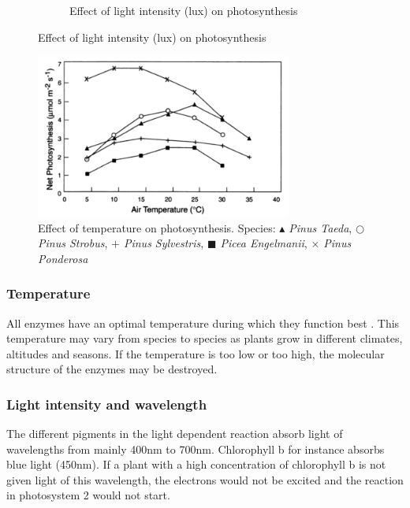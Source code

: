 \begin{figure}
\begin{subfigure}[b]{0.45\textwidth}
                \caption{Effect of light intensity (lux) on photosynthesis}
                \label{fig:lightintensity}
        \end{subfigure}
       
\end{figure}

\begin{figure}
\centering
\includegraphics[width=0.75\textwidth]{img/photosynthesis/temperature_new.png}
\caption{Effect of temperature on photosynthesis. Species:
 \textit{\ensuremath{\blacktriangle} Pinus Taeda},  
\textit{\ensuremath{\bigcirc} Pinus Strobus}, 
\textit{\ensuremath{+} Pinus Sylvestris}, 
\textit{\ensuremath{\blacksquare} Picea Engelmanii}, 
\textit{\ensuremath{\times} Pinus Ponderosa}
\citep{hollinger1995external}
}
\label{fig:temperature}
\end{figure}

\subsubsection{Temperature}
All enzymes have an optimal temperature during which they function best \citep{bios}. This temperature may vary from species to species as plants grow in different climates, altitudes and seasons. If the temperature is too low or too high, the molecular structure of the enzymes may be destroyed.

\subsubsection{Light intensity and wavelength}
The different pigments in the light dependent reaction absorb light of wavelengths from mainly 400nm to 700nm. Chlorophyll b for instance absorbs blue light (450nm). If a plant with a high concentration of chlorophyll b is not given light of this wavelength, the electrons would not be excited and the reaction in photosystem 2 would not start.

